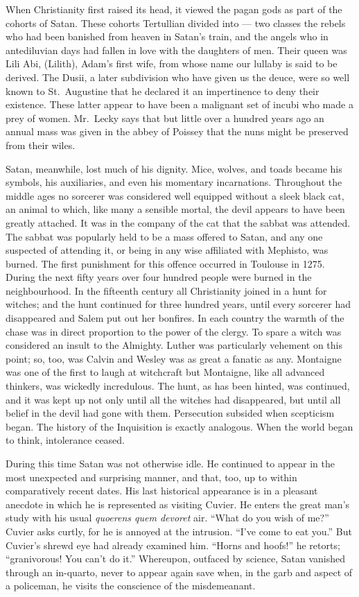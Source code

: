 \documentclass[]{book}
\begin{document}
When Christianity first raised its head, it viewed the pagan gods as
part of the cohorts of Satan. These cohorts Tertullian divided into ---
two classes the rebels who had been banished from heaven in Satan's
train, and the angels who in antediluvian days had fallen in love with
the daughters of men. Their queen was Lili Abi, (Lilith), Adam's first
wife, from whose name our lullaby is said to be derived. The Dusii, a
later subdivision who have given us the deuce, were so well known to
St.~Augustine that he declared it an impertinence to deny their
existence. These latter appear to have been a malignant set of incubi
who made a prey of women. Mr.~Lecky says that but little over a hundred
years ago an annual mass was given in the abbey of Poissey that the nuns
might be preserved from their wiles.

Satan, meanwhile, lost much of his dignity. Mice, wolves, and toads
became his symbols, his auxiliaries, and even his momentary
incarnations. Throughout the middle ages no sorcerer was considered well
equipped without a sleek black cat, an animal to which, like many a
sensible mortal, the devil appears to have been greatly attached. It was
in the company of the cat that the sabbat was attended. The sabbat was
popularly held to be a mass offered to Satan, and any one suspected of
attending it, or being in any wise affiliated with Mephisto, was burned.
The first punishment for this offence occurred in Toulouse in 1275.
During the next fifty years over four hundred people were burned in the
neighbourhood. In the fifteenth century all Christianity joined in a
hunt for witches; and the hunt continued for three hundred years, until
every sorcerer had disappeared and Salem put out her bonfires. In each
country the warmth of the chase was in direct proportion to the power of
the clergy. To spare a witch was considered an insult to the Almighty.
Luther was particularly vehement on this point; so, too, was Calvin and
Wesley was as great a fanatic as any. Montaigne was one of the first to
laugh at witchcraft but Montaigne, like all advanced thinkers, was
wickedly incredulous. The hunt, as has been hinted, was continued, and
it was kept up not only until all the witches had disappeared, but until
all belief in the devil had gone with them. Persecution subsided when
scepticism began. The history of the Inquisition is exactly analogous.
When the world began to think, intolerance ceased.

During this time Satan was not otherwise idle. He continued to appear in
the most unexpected and surprising manner, and that, too, up to within
comparatively recent dates. His last historical appearance is in a
pleasant anecdote in which he is represented as visiting Cuvier. He
enters the great man's study with his usual \emph{quoerens quem devoret}
air. ``What do you wish of me?'' Cuvier asks curtly, for he is annoyed
at the intrusion. ``I've come to eat you.'' But Cuvier's shrewd eye had
already examined him. ``Horns and hoofs!'' he retorts; ``granivorous!
You can't do it.'' Whereupon, outfaced by science, Satan vanished
through an in-quarto, never to appear again save when, in the garb and
aspect of a policeman, he visits the conscience of the misdemeanant.
\end{document}
